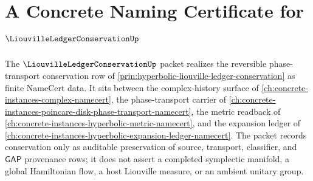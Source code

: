 \chapter{A Concrete Naming Certificate for $\LiouvilleLedgerConservationUp$}
\label{ch:concrete-instances-liouville-ledger-conservation-namecert}

The $\LiouvilleLedgerConservationUp$ packet realizes the reversible phase-transport conservation row of \autoref{prin:hyperbolic-liouville-ledger-conservation} as finite NameCert data. It sits between the complex-history surface of \autoref{ch:concrete-instances-complex-namecert}, the phase-transport carrier of \autoref{ch:concrete-instances-poincare-disk-phase-transport-namecert}, the metric readback of \autoref{ch:concrete-instances-hyperbolic-metric-namecert}, and the expansion ledger of \autoref{ch:concrete-instances-hyperbolic-expansion-ledger-namecert}. The packet records conservation only as auditable preservation of source, transport, classifier, and $\mathsf{GAP}$ provenance rows; it does not assert a completed symplectic manifold, a global Hamiltonian flow, a host Liouville measure, or an ambient unitary group.



